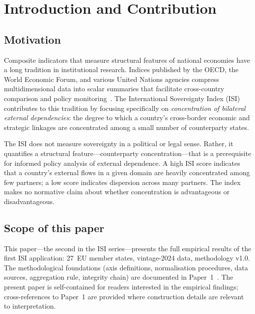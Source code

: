 \section{Introduction and Contribution}\label{sec:introduction}

\subsection{Motivation}

Composite indicators that measure structural features of national
economies have a long tradition in institutional research.  Indices
published by the OECD, the World Economic Forum, and various United
Nations agencies compress multidimensional data into scalar summaries
that facilitate cross-country comparison and policy
monitoring~\cite{oecd_handbook_2008}.  The International Sovereignty
Index (ISI) contributes to this tradition by focusing specifically on
\emph{concentration of bilateral external dependencies}: the degree to
which a country's cross-border economic and strategic linkages are
concentrated among a small number of counterparty states.

The ISI does not measure sovereignty in a political or legal sense.
Rather, it quantifies a structural feature---counterparty
concentration---that is a prerequisite for informed policy analysis of
external dependence.  A high ISI score indicates that a country's
external flows in a given domain are heavily concentrated among few
partners; a low score indicates dispersion across many partners.  The
index makes no normative claim about whether concentration is
advantageous or disadvantageous.

\subsection{Scope of this paper}

This paper---the second in the ISI series---presents the full
empirical results of the first ISI application: 27~EU member states,
vintage-2024 data, methodology v1.0.  The methodological foundations
(axis definitions, normalisation procedures, data sources, aggregation
rule, integrity chain) are documented in Paper~1~\cite{isi_paper1}.
The present paper is self-contained for readers interested in the
empirical findings; cross-references to Paper~1 are provided where
construction details are relevant to interpretation.

